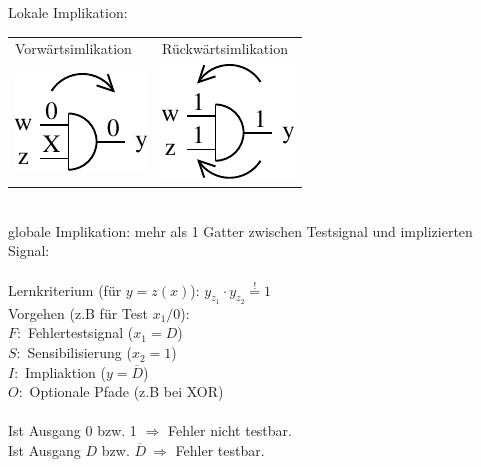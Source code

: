 \documentclass[6pt,a4paper]{scrartcl}
\newcommand{\ol}[1]{\ensuremath{\overline{#1}}}									%
\newcommand{\Ra}[0]{\ensuremath{\Rightarrow}}									%
\begin{document}
\begin{multicols}{3}
	Lokale Implikation:
	\begin{tabular}{ll}
	Vorwärtsimlikation & Rückwärtsimlikation\\
	\includegraphics[scale = 0.8]{./img/ds/vorimplikation.pdf} & \includegraphics[scale = 0.7]{./img/ds/backimplication.pdf}\\%
	\end{tabular}
	\\
	globale Implikation: mehr als 1 Gatter zwischen Testsignal und implizierten Signal:\\
	\boxed{ A \Ra B \ \Leftrightarrow\  \ol B \Ra \ol A}\\
	Lernkriterium (für $y=z(x)$): $y_{z_1} \cdot y_{z_2} \stackrel{!}= 1$\\

	Vorgehen (z.B für Test $x_1/0$):\\
	$F:$ Fehlertestsignal ($x_1 = D$)\\
	$S:$ Sensibilisierung ($x_2 = 1$)\\
	$I:$ Impliaktion ($y = \ol D$)\\
	$O:$ Optionale Pfade (z.B bei XOR)\\
	\\
	Ist Ausgang $0$ bzw. 1 $\Ra$ Fehler nicht testbar.\\
	Ist Ausgang $D$ bzw. $\ol D\ \Ra$ Fehler testbar.\\


\end{multicols}
\end{document}
